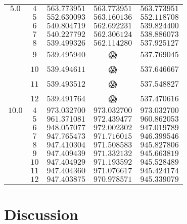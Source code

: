 \documentclass[
    a4paper, aps, twocolumn, floatfix, superscriptaddress,
    nofootinbib]{revtex4-1}
\newcommand{\nan}{\DejaSans 😱}
\newcommand{\1}{\mathds{1}}
\begin{document}
\begin{table}
\begin{ruledtabular}
\begin{tabular}{c|c|ccc}
                $5.0$ & $4$ & $563.773951$ & $563.773951$ & $563.773951$ \\
                      & $5$ & $552.630093$ & $563.160136$ & $552.118708$ \\
                      & $6$ & $540.804719$ & $562.692231$ & $539.824400$ \\
                      & $7$ & $540.227792$ & $562.306124$ & $538.886073$ \\
                      & $8$ & $539.499326$ & $562.114280$ & $537.925127$ \\
                      & $9$ & $539.495940$ & \nan & $537.769045$ \\
                      & $10$ & $539.494611$ & \nan & $537.646667$ \\
                      & $11$ & $539.493512$ & \nan & $537.548827$ \\
                      & $12$ & $539.491764$ & \nan & $537.470616$ \\
                \hline
                $10.0$ & $4$ & $973.032700$ & $973.032700$ & $973.032700$ \\
                       & $5$ & $961.371081$ & $972.439477$ & $960.862053$ \\
                       & $6$ & $948.057077$ & $972.002302$ & $947.019789$ \\
                       & $7$ & $947.765473$ & $971.716015$ & $946.399546$ \\
                       & $8$ & $947.410304$ & $971.508583$ & $945.827806$ \\
                       & $9$ & $947.409439$ & $971.332132$ & $945.663819$ \\
                       & $10$ & $947.404929$ & $971.193592$ & $945.528489$ \\
                       & $11$ & $947.404360$ & $971.076617$ & $945.424174$ \\
                       & $12$ & $947.403875$ & $970.978571$ & $945.339079$ \\
            \end{tabular}
        \end{ruledtabular}
        \label{tab:N20}
    \end{table}

\section{Discussion}
\end{document}
